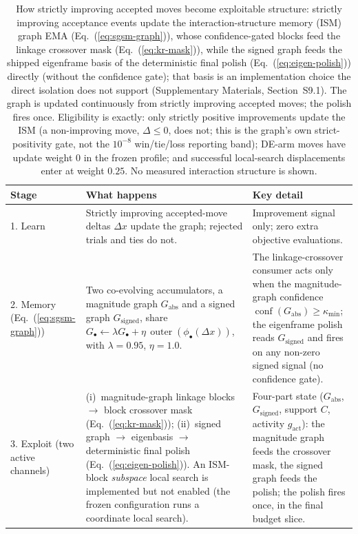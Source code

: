 \begin{table}[t]
\caption{How strictly improving accepted moves become exploitable structure:
strictly improving acceptance events update the interaction-structure
memory (ISM) graph EMA (Eq.~(\ref{eq:sgsm-graph})), whose confidence-gated
blocks feed the linkage crossover mask (Eq.~(\ref{eq:kr-mask})), while the
signed graph feeds the shipped eigenframe basis of the deterministic final
polish (Eq.~(\ref{eq:eigen-polish})) directly (without the confidence gate);
that basis is an implementation choice the direct isolation does not
support (Supplementary Materials, Section~S9.1).
The graph is updated continuously from strictly improving accepted moves; the
polish fires once. Eligibility is exactly: only strictly positive improvements
update the ISM (a non-improving move, $\Delta \le 0$, does not; this is the
graph's own strict-positivity gate, not the $10^{-8}$ win/tie/loss reporting
band); DE-arm moves have update weight $0$ in the frozen profile; and
successful local-search displacements enter at weight $0.25$.
No measured interaction structure is shown.}
\label{tab:sgsm-mechanism}
\centering
\footnotesize
\begin{tabular}{p{2.4cm}p{7.6cm}p{3.7cm}}
\toprule
\textbf{Stage} & \textbf{What happens} & \textbf{Key detail} \\
\midrule
1. Learn & Strictly improving accepted-move deltas $\Delta x$ update the graph; rejected trials and ties do not. & Improvement signal only; zero extra objective evaluations. \\
2. Memory (Eq.~(\ref{eq:sgsm-graph})) & Two co-evolving accumulators, a magnitude graph $G_{\mathrm{abs}}$ and a signed graph $G_{\mathrm{signed}}$, share $G_\bullet \gets \lambda G_\bullet + \eta\,\operatorname{outer}(\phi_\bullet(\Delta x))$, with $\lambda{=}0.95$, $\eta{=}1.0$. & The linkage-crossover consumer acts only when the magnitude-graph confidence $\operatorname{conf}(G_{\mathrm{abs}})\ge\kappa_{\min}$; the eigenframe polish reads $G_{\mathrm{signed}}$ and fires on any non-zero signed signal (no confidence gate). \\
3. Exploit (two active channels) & (i)~magnitude-graph linkage blocks $\to$ block crossover mask (Eq.~(\ref{eq:kr-mask})); (ii)~signed graph $\to$ eigenbasis $\to$ deterministic final polish (Eq.~(\ref{eq:eigen-polish})). An ISM-block \emph{subspace} local search is implemented but not enabled (the frozen configuration runs a coordinate local search). & Four-part state ($G_{\mathrm{abs}}$, $G_{\mathrm{signed}}$, support $C$, activity $g_{\mathrm{act}}$): the magnitude graph feeds the crossover mask, the signed graph feeds the polish; the polish fires once, in the final budget slice. \\
\bottomrule
\end{tabular}
\end{table}

